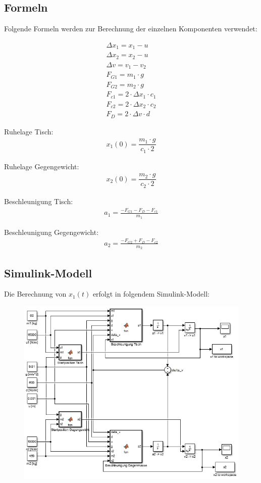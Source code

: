 \documentclass[]{scrartcl}
\begin{document}
\subsection{Formeln}
Folgende Formeln werden zur Berechnung der einzelnen Komponenten verwendet:

\begin{align}
\Delta x_{1} = x_{1} - u \\
\Delta x_{2} = x_{2} - u\\
\Delta v = v_{1} - v_{2}\\
F_{G1} = m_{1} \cdot g\\
F_{G2} = m_{2} \cdot g\\
F_{c1} = 2 \cdot \Delta x_{1} \cdot c_{1}\\
F_{c2} = 2 \cdot \Delta x_{2} \cdot c_{2}\\
F_{D} = 2 \cdot \Delta v \cdot d
\end{align}

Ruhelage Tisch:
\begin{align}
x_{1}(0) = \dfrac{m_{1} \cdot g}{c_{1} \cdot 2}
\end{align}

Ruhelage Gegengewicht:
\begin{align}
x_{2}(0) = \dfrac{m_{2} \cdot g}{c_{2} \cdot 2}
\end{align}

Beschleunigung Tisch:
\begin{align}
a_{1} = \frac{-F_{G1} - F_{D} - F_{c1}}{m_{1}}
\end{align}

Beschleunigung Gegengewicht:
\begin{align}
a_{2} = \frac{-F_{G2} + F_{D} - F_{c2}}{m_{2}}
\end{align}

\subsection{Simulink-Modell}
Die Berechnung von $x_{1}(t)$ erfolgt in folgendem Simulink-Modell:

\begin{figure}[H]
\centering
\includegraphics[width=1\linewidth]{./4_Modell}
\caption{}
\label{fig:4_Modell}
\end{figure}
\end{document}
